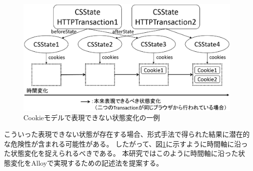 \documentclass[12pt,a4paper]{jbook}
\begin{document}
\begin{figure}[htb]
\centering
\includegraphics[width=450pt]{./fig/2transaction-b.eps}
\caption{Cookieモデルで表現できない状態変化の一例}
\label{fig:2transaction-b}
\end{figure}
こういった表現できない状態が存在する場合、形式手法で得られた結果に潜在的な危険性が含まれる可能性がある。
したがって、図\ref{fig:2transaction-b}に示すように時間軸に沿った状態変化を捉えられるべきである。
本研究ではこのように時間軸に沿った状態変化をAlloyで実現するための記述法を提案する。
\color{black}
\end{document}
